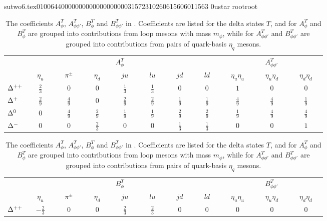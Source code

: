                                                                                                                                                                                                                                                                                       sutwo6.tex                                                                                          0100644 0000000 0000000 00000315723 10260615606 011563  0                                                                                                    ustar   root                            root                                                                                                                                                                                                                   \documentclass[prd,amssymb,amsmath,showpacs,nofootinbib,superscriptaddress]{revtex4}
\begin{document}
\begin{table}[ht]
\caption{The coefficients $A^T_\phi$, $A^T_{\phi\phi'}$, $B^T_\phi$
  and $B^T_{\phi\phi'}$ in \PQCPT. Coefficients are listed for the
  delta states $T$, and for $A^T_\phi$ and $B^T_\phi$ are grouped into
  contributions from loop mesons with mass $m_\phi$, while for
  $A^T_{\phi\phi'}$ and $B^T_{\phi\phi'}$ are grouped into
  contributions from pairs of quark-basis $\eta_q$ mesons.}
\begin{tabular}{l | c c c c c c c | c c c }
 & \multicolumn{7}{c|}{$A^T_\phi \phantom{ap}$} & \multicolumn{3}{c}{$A^T_{\phi\phi'}$ \phantom{sp}} \\
    & $\quad \eta_u \quad$ & $\quad \pi^\pm \quad $ & $\quad  \eta_d \quad $ 
    & $ \quad ju \quad$ & $ \quad lu \quad$ 
    & $\quad jd \quad$  & $\quad ld \quad$ 
    & $\quad \eta_u \eta_u \quad $ & $\quad \eta_u \eta_d\quad $   & $\quad \eta_d \eta_d\quad$ \\
\hline
${\Delta}^{++}$  &  $\frac{2}{3}$ & $0$  & $0$  
           &  $\frac{1}{3}$ & $\frac{1}{3}$  
           &  $0$ & $0$
           &  $1$ & $0$ & $0$ \\

${\Delta}^+$     &  $\frac{2}{9}$ & $\frac{4}{9}$  & $0$  
           &  $\frac{2}{9}$ & $\frac{2}{9}$  
           &  $\frac{1}{9}$ & $\frac{1}{9}$
           &  $\frac{4}{9}$ & $\frac{4}{9}$ & $\frac{1}{9}$ \\

${\Delta}^0$     &  $0$ & $\frac{4}{9}$  & $\frac{2}{9}$  
           &  $\frac{1}{9}$ & $\frac{1}{9}$  
           &  $\frac{2}{9}$ & $\frac{2}{9}$
           &  $\frac{1}{9}$ & $\frac{4}{9}$ & $\frac{4}{9}$ \\

${\Delta}^-$     &  $0$ & $0$  & $\frac{2}{3}$  
           &  $0$ & $0$  
           &  $\frac{1}{3}$ & $\frac{1}{3}$
           &  $0$ & $0$ & $1$ \\
 
\end{tabular}

\bigskip

\begin{tabular}{l | c c c c c c c | c c c }
 & \multicolumn{7}{c|}{$B^T_\phi \phantom{ap}$} & \multicolumn{3}{c}{$B^T_{\phi\phi'}$ \phantom{sp}} \\
    & $\quad \eta_u \quad$ & $\quad \pi^\pm \quad $ & $\quad \eta_d \quad $ 
    & $ \quad ju \quad$ & $ \quad lu \quad$ 
    & $\quad jd \quad$  & $\quad ld \quad$ 
    & $\quad \eta_u \eta_u \quad $ & $\quad \eta_u \eta_d \quad $   & $\quad \eta_d \eta_d \quad$ \\
\hline
${\Delta}^{++}$       &  $-\frac{2}{3}$ & $0$  & $0$  
           &  $\frac{2}{3}$ & $\frac{2}{3}$  
           &  $0$ & $0$
           &  $0$ & $0$ & $0$ \\


\end{tabular}
\end{table}
\end{document}
